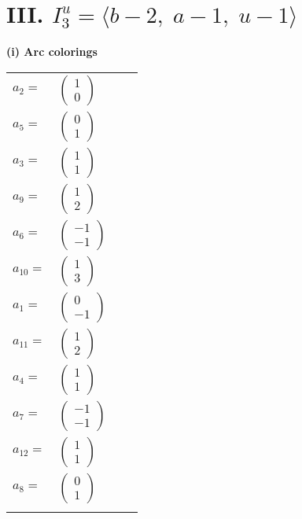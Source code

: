 \documentclass[1p]{elsarticle_modified}
\theoremstyle{definition}
\begin{document}
\centering \section*{III. $I^u_{3}= \langle b-2,\;a-1,\;u-1 \rangle$}
\flushleft \textbf{(i) Arc colorings}\\
\begin{tabular}{m{7pt} m{180pt} m{7pt} m{180pt} }
\flushright $a_{2}=$&$\begin{pmatrix}1\\0\end{pmatrix}$ \\
\flushright $a_{5}=$&$\begin{pmatrix}0\\1\end{pmatrix}$ \\
\flushright $a_{3}=$&$\begin{pmatrix}1\\1\end{pmatrix}$ \\
\flushright $a_{9}=$&$\begin{pmatrix}1\\2\end{pmatrix}$ \\
\flushright $a_{6}=$&$\begin{pmatrix}-1\\-1\end{pmatrix}$ \\
\flushright $a_{10}=$&$\begin{pmatrix}1\\3\end{pmatrix}$ \\
\flushright $a_{1}=$&$\begin{pmatrix}0\\-1\end{pmatrix}$ \\
\flushright $a_{11}=$&$\begin{pmatrix}1\\2\end{pmatrix}$ \\
\flushright $a_{4}=$&$\begin{pmatrix}1\\1\end{pmatrix}$ \\
\flushright $a_{7}=$&$\begin{pmatrix}-1\\-1\end{pmatrix}$ \\
\flushright $a_{12}=$&$\begin{pmatrix}1\\1\end{pmatrix}$ \\
\flushright $a_{8}=$&$\begin{pmatrix}0\\1\end{pmatrix}$\\&\end{tabular}
\end{document}
